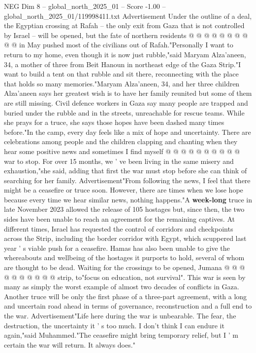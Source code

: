 \begin{textsample}{NEG Dim 8 – global\_north\_2025\_01 – Score -1.00 – global\_north\_2025\_01/119998411.txt}
Advertisement Under the outline of a deal, the Egyptian crossing at Rafah -- the only exit from Gaza that is not controlled by Israel -- will be opened, but the fate of northern residents @ @ @ @ @ @ @ @ @ @ in May pushed most of the civilians out of Rafah."Personally I want to return to my home, even though it is now just rubble,"said Maryam Alza'aneen, 34, a mother of three from Beit Hanoun in northeast edge of the Gaza Strip."I want to build a tent on that rubble and sit there, reconnecting with the place that holds so many memories."Maryam Alza'aneen, 34, and her three children Alza'aneen says her greatest wish is to have her family reunited but some of them are still missing.
Civil defence workers in Gaza say many people are trapped and buried under the rubble and in the streets, unreachable for rescue teams.
While she prays for a truce, she says those hopes have been dashed many times before."In the camp, every day feels like a mix of hope and uncertainty.
There are celebrations among people and the children clapping and chanting when they hear some positive news and sometimes I find myself @ @ @ @ @ @ @ @ @ @ war to stop.
For over 15 months, we ' ve been living in the same misery and exhaustion,"she said, adding that first the war must stop before she can think of searching for her family.
Advertisement"From following the news, I feel that there might be a ceasefire or truce soon.
However, there are times when we lose hope because every time we hear similar news, nothing happens."A \textbf{week-long} truce in late November 2023 allowed the release of 105 hostages but, since then, the two sides have been unable to reach an agreement for the remaining captives.
At different times, Israel has requested the control of corridors and checkpoints across the Strip, including the border corridor with Egypt, which scuppered last year ' s viable push for a ceasefire.
Hamas has also been unable to give the whereabouts and wellbeing of the hostages it purports to hold, several of whom are thought to be dead.
Waiting for the crossings to be opened, Jumana @ @ @ @ @ @ @ @ @ @ strip, to"focus on education, not survival".
This war is seen by many as simply the worst example of almost two decades of conflicts in Gaza.
Another truce will be only the first phase of a three-part agreement, with a long and uncertain road ahead in terms of governance, reconstruction and a full end to the war.
Advertisement"Life here during the war is unbearable.
The fear, the destruction, the uncertainty it ' s too much.
I don't think I can endure it again,"said Muhammed."The ceasefire might bring temporary relief, but I ' m certain the war will return.
It always does."

\end{textsample}

